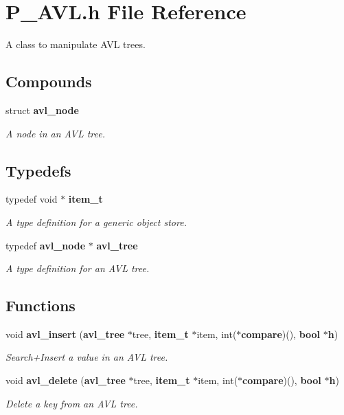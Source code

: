 \section{P\_\-AVL.h File Reference}
\label{P__AVL_8h}
A class to manipulate AVL trees. 


\subsection*{Compounds}
\begin{CompactItemize}
\item 
struct {\bf avl\_\-node}
\begin{CompactList}\small\item\em A node in an AVL tree.\item\end{CompactList}\end{CompactItemize}
\subsection*{Typedefs}
\begin{CompactItemize}
\item 
typedef void $\ast$ {\bf item\_\-t}
\begin{CompactList}\small\item\em A type definition for a generic object store.\item\end{CompactList}\item 
typedef {\bf avl\_\-node} $\ast$ {\bf avl\_\-tree}
\begin{CompactList}\small\item\em A type definition for an AVL tree.\item\end{CompactList}\end{CompactItemize}
\subsection*{Functions}
\begin{CompactItemize}
\item 
void {\bf avl\_\-insert} ({\bf avl\_\-tree} $\ast$tree, {\bf item\_\-t} $\ast$item, int($\ast${\bf compare})(), {\bf bool} $\ast${\bf h})
\begin{CompactList}\small\item\em Search+Insert a value in an AVL tree.\item\end{CompactList}\item 
void {\bf avl\_\-delete} ({\bf avl\_\-tree} $\ast$tree, {\bf item\_\-t} $\ast$item, int($\ast${\bf compare})(), {\bf bool} $\ast${\bf h})
\begin{CompactList}\small\item\em Delete a key from an AVL tree.\item\end{CompactList}\end{CompactItemize}


